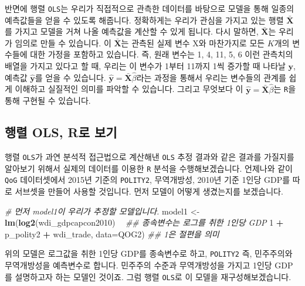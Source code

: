 \documentclass[
]{book}
\newenvironment{Shaded}{\begin{snugshade}}{\end{snugshade}}
\newcommand{\CommentTok}[1]{\textcolor[rgb]{0.56,0.35,0.01}{\textit{#1}}}
\newcommand{\DataTypeTok}[1]{\textcolor[rgb]{0.13,0.29,0.53}{#1}}
\newcommand{\DecValTok}[1]{\textcolor[rgb]{0.00,0.00,0.81}{#1}}
\newcommand{\KeywordTok}[1]{\textcolor[rgb]{0.13,0.29,0.53}{\textbf{#1}}}
\newcommand{\NormalTok}[1]{#1}
\newcommand{\OperatorTok}[1]{\textcolor[rgb]{0.81,0.36,0.00}{\textbf{#1}}}
\newcommand{\StringTok}[1]{\textcolor[rgb]{0.31,0.60,0.02}{#1}}
\begin{document}
반면에 행렬 \texttt{OLS}는 우리가 직접적으로 관측한 데이터를 바탕으로 모델을 통해 일종의 예측값들을 얻을 수 있도록 해줍니다. 정확하게는 우리가 관심을 가지고 있는 행렬 \(\bar{\textbf{X}}\)를 가지고 모델을 거쳐 나올 예측값을 계산할 수 있게 됩니다. 다시 말하면, \(\bar{\textbf{X}}\)는 우리가 임의로 만들 수 있습니다. 이 \(\bar{\textbf{X}}\)는 관측된 실제 변수 \(\text{X}\)와 마찬가지로 모든 \(K\)개의 변수들에 대한 가정을 포함하고 있습니다. 즉, 원래 변수는 1, 4, 11, 5, 6 이런 관측치의 배열을 가지고 있다고 할 때, 우리는 이 변수가 1부터 11까지 1씩 증가할 때 나타날 \(\textbf{y}\), 예측값 \(\hat{\textbf{y}}\)를 얻을 수 있습니다. \(\hat{\textbf{y}} = \bar{\textbf{X}}\hat{\beta}\)라는 과정을 통해서 우리는 변수들의 관계를 쉽게 이해하고 실질적인 의미를 파악할 수 있습니다. 그리고 무엇보다 이 \(\hat{\textbf{y}} = \bar{\textbf{X}}\hat{\beta}\)는 \texttt{R}을 통해 구현될 수 있습니다.

\hypertarget{uxd589uxb82c-ols-ruxb85c-uxbcf4uxae30}{%
\subsection{행렬 OLS, R로 보기}\label{uxd589uxb82c-ols-ruxb85c-uxbcf4uxae30}}

행렬 \texttt{OLS}가 과연 분석적 접근법으로 계산해낸 \texttt{OLS} 추정 결과와 같은 결과를 가질지를 알아보기 위해서 실제의 데이터를 이용한 \texttt{R} 분석을 수행해보겠습니다. 언제나와 같이 \texttt{QoG} 데이터셋에서 2015년 기준의 \texttt{POLITY2}, 무역개방성, 2010년 기준 1인당 GDP를 따로 서브셋을 만들어 사용할 것입니다. 먼저 모델이 어떻게 생겼는지를 보겠습니다.

\begin{Shaded}
\begin{Highlighting}[]
\CommentTok{# 먼저 model1이 우리가 추정할 모델입니다.}
\NormalTok{model1 <-}\StringTok{ }\KeywordTok{lm}\NormalTok{(}\KeywordTok{log2}\NormalTok{(wdi_gdpcapcon2010) }\OperatorTok{~}\StringTok{ }\CommentTok{## 종속변수는 로그를 취한 1인당 GDP}
\StringTok{               }\DecValTok{1} \OperatorTok{+}\StringTok{ }\NormalTok{p_polity2 }\OperatorTok{+}\StringTok{ }\NormalTok{wdi_trade, }\DataTypeTok{data=}\NormalTok{QOG2) }\CommentTok{## 1은 절편을 의미}
\end{Highlighting}
\end{Shaded}

위의 모델은 로그값을 취한 1인당 GDP를 종속변수로 하고, \texttt{POLITY2} 즉, 민주주의와 무역개방성을 예측변수로 합니다. 민주주의 수준과 무역개방성을 가지고 1인당 GDP를 설명하고자 하는 모델인 것이죠. 그럼 행렬 \texttt{OLS}로 이 모델을 재구성해보겠습니다.
\end{document}
